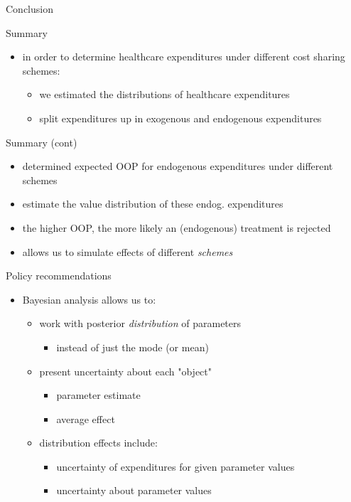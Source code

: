 \documentclass[presentation]{beamer}
\begin{document}
\begin{frame}[label={sec:org22618ff}]{Conclusion}
\begin{block}{Summary}
\begin{itemize}
\item in order to determine healthcare expenditures under different cost sharing schemes:
\begin{itemize}
\item we estimated the distributions of healthcare expenditures
\item split expenditures up in exogenous and endogenous expenditures
\end{itemize}
\end{itemize}
\end{block}

\begin{block}{Summary (cont)}
\begin{itemize}
\item determined expected OOP for endogenous expenditures under different schemes
\item estimate the value distribution of these endog. expenditures
\item the higher OOP, the more likely an (endogenous) treatment is rejected
\item allows us to simulate effects of different \emph{schemes}
\end{itemize}
\end{block}

\begin{block}{Policy recommendations}
\begin{itemize}
\item Bayesian analysis allows us to:
\begin{itemize}
\item work with posterior \emph{distribution} of parameters
\begin{itemize}
\item instead of just the mode (or mean)
\end{itemize}
\item present uncertainty about each "object"
\begin{itemize}
\item parameter estimate
\item average effect
\end{itemize}
\item distribution effects include:
\begin{itemize}
\item uncertainty of expenditures for given parameter values
\item uncertainty about parameter values
\end{itemize}
\end{itemize}
\end{itemize}
\end{block}


\end{frame}
\end{document}
